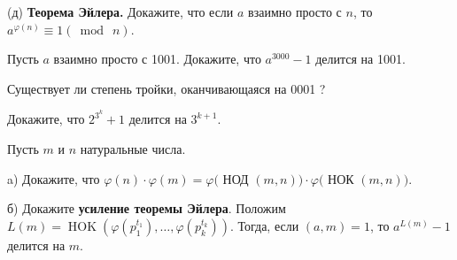 (д) \textbf{Теорема Эйлера.} Докажите, что если $a$ взаимно просто с $n$, то $a^{\varphi(n)} \equiv 1(\bmod\ n)$.

Пусть $a$ взаимно просто с 1001. Докажите, что $a^{3000}-1$ делится на 1001.

Существует ли степень тройки, оканчивающаяся на 0001 ?

Докажите, что $2^{3^k}+1$ делится на $3^{k+1}$.

 Пусть $m$ и $n$ натуральные числа.

a) Докажите, что $\varphi(n) \cdot \varphi(m)=\varphi($ НОД $(m, n)) \cdot \varphi($ НОК $(m, n))$.

б) Докажите \textbf{усиление теоремы Эйлера}. Положим $L(m)=\operatorname{HOK}\left(\varphi\left(p_1^{t_1}\right), \ldots, \varphi\left(p_k^{t_k}\right)\right)$. Тогда, если $(a, m)=1$, то $a^{L(m)}-1$ делится на $m$.
